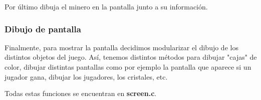 \documentclass[a4paper]{article}
\begin{document}
Por último dibuja el minero en la pantalla junto a su información.

\subsubsection{Dibujo de pantalla}

Finalmente, para mostrar la pantalla decidimos modularizar el dibujo de los distintos objetos del juego. Así, tenemos
distintos métodos para dibujar "cajas" de color, dibujar distintas pantallas como por ejemplo la pantalla que aparece si
un jugador gana, dibujar los jugadores, los cristales, etc.

Todas estas funciones se encuentran en \textbf{screen.c}.
\end{document}
